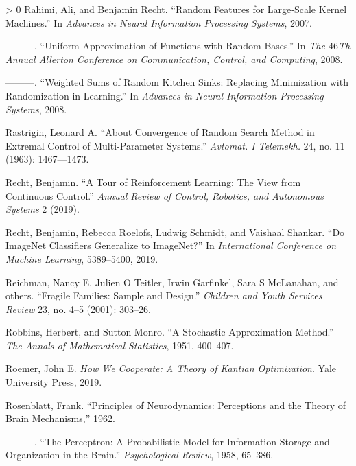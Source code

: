 \documentclass{tufte-book}
\newlength{\cslhangindent}
\newenvironment{CSLReferences}[3] %
 {%
  \setlength{\parindent}{0pt}
  \ifodd #1 \everypar{\setlength{\hangindent}{\cslhangindent}}\ignorespaces\fi
  \ifnum #2 > 0
  \setlength{\parskip}{#3\baselineskip}
  \fi
 }%
 {
 }
\begin{document}
\begin{CSLReferences}{1}{0}
\leavevmode\hypertarget{ref-RahimiRecht07}{}%
Rahimi, Ali, and Benjamin Recht. {``Random Features for Large-Scale
Kernel Machines.''} In \emph{Advances in Neural Information Processing
Systems}, 2007.

\leavevmode\hypertarget{ref-RahimiRechtAllerton08}{}%
---------. {``Uniform Approximation of Functions with Random Bases.''}
In \emph{The \(46\)Th Annual Allerton Conference on Communication,
Control, and Computing}, 2008.

\leavevmode\hypertarget{ref-RahimiRechtNIPS08}{}%
---------. {``Weighted Sums of Random Kitchen Sinks: Replacing
Minimization with Randomization in Learning.''} In \emph{Advances in
Neural Information Processing Systems}, 2008.

\leavevmode\hypertarget{ref-Rastrigin63}{}%
Rastrigin, Leonard A. {``About Convergence of Random Search Method in
Extremal Control of Multi-Parameter Systems.''} \emph{Avtomat. I
Telemekh.} 24, no. 11 (1963): 1467---1473.

\leavevmode\hypertarget{ref-RechtRLSurvey}{}%
Recht, Benjamin. {``A Tour of Reinforcement Learning: The View from
Continuous Control.''} \emph{Annual Review of Control, Robotics, and
Autonomous Systems} 2 (2019).

\leavevmode\hypertarget{ref-recht2019imagenet}{}%
Recht, Benjamin, Rebecca Roelofs, Ludwig Schmidt, and Vaishaal Shankar.
{``Do ImageNet Classifiers Generalize to ImageNet?''} In
\emph{International Conference on Machine Learning}, 5389--5400, 2019.

\leavevmode\hypertarget{ref-reichman2001fragile}{}%
Reichman, Nancy E, Julien O Teitler, Irwin Garfinkel, Sara S McLanahan,
and others. {``Fragile Families: Sample and Design.''} \emph{Children
and Youth Services Review} 23, no. 4--5 (2001): 303--26.

\leavevmode\hypertarget{ref-robbins1951stochastic}{}%
Robbins, Herbert, and Sutton Monro. {``A Stochastic Approximation
Method.''} \emph{The Annals of Mathematical Statistics}, 1951, 400--407.

\leavevmode\hypertarget{ref-roemer19how}{}%
Roemer, John E. \emph{How We Cooperate: A Theory of Kantian
Optimization}. Yale University Press, 2019.

\leavevmode\hypertarget{ref-rosenblatt1962principles}{}%
Rosenblatt, Frank. {``Principles of Neurodynamics: Perceptions and the
Theory of Brain Mechanisms,''} 1962.

\leavevmode\hypertarget{ref-rosenblatt58theperceptron}{}%
---------. {``The Perceptron: A Probabilistic Model for Information
Storage and Organization in the Brain.''} \emph{Psychological Review},
1958, 65--386.


\end{CSLReferences}
\end{document}
